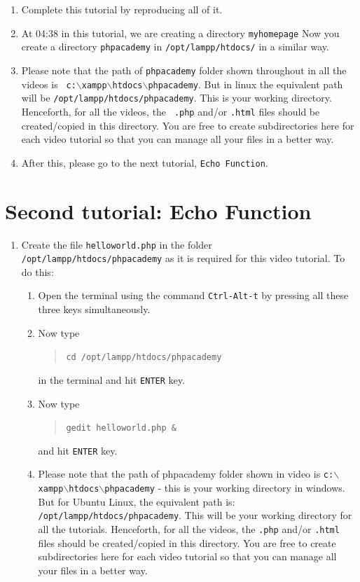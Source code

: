 \documentclass[11pt]{article}
\newenvironment{enumcpt}{\begin{enumerate} \topsep 0pt \partopsep 0pt 
    \parsep 0pt
    \itemsep 0pt \leftmargin -1in \rightmargin 0pt
}{\end{enumerate}}
\begin{document}
\begin{multicols}{2}
\begin{enumcpt}
\item Complete this tutorial by reproducing all of it.

\item At 04:38 in this tutorial, we are creating a directory {\tt myhomepage}  Now you create a directory {\tt phpacademy} in {\tt /opt/lampp/htdocs/} in a similar way.

\item Please note that the path of {\tt phpacademy} folder shown throughout in all the videos is {\tt
    c:$\backslash$xampp$\backslash$htdocs$\backslash$phpacademy}. But in linux the equivalent path will be {\tt /opt/lampp/htdocs/phpacademy}. This is your working directory. Henceforth, for all the videos, the {\tt
    .php} and/or {\tt .html} files should be created/copied in this
  directory. You are free to create subdirectories here for each video
  tutorial so that you can manage all your files in a better way.

\item   After this, please go to the next tutorial, {\tt Echo Function}.

  \end{enumcpt}


  \section{Second tutorial: Echo Function}
  \begin{enumcpt}
  \item Create the file {\tt helloworld.php} in the folder {\tt
    /opt/lampp/htdocs/phpacademy} as it is required for this video
    tutorial. To do this:
    \begin{enumcpt}
    \item Open the terminal using the command {\tt Ctrl-Alt-t} by
      pressing all these three keys simultaneously.
    \item Now type
      \begin{quote}
        {\tt cd /opt/lampp/htdocs/phpacademy}
      \end{quote}
      in the terminal and hit {\tt ENTER} key.
    \item  Now type 
      \begin{quote}
        {\tt gedit helloworld.php \&}
      \end{quote}
      and hit {\tt ENTER} key.
 \item Please note that the path of phpacademy folder shown in video is
    {\tt c:$\backslash$xampp$\backslash$htdocs$\backslash$phpacademy}
    - this is your working directory in windows. But for Ubuntu Linux, the
    equivalent path is: {\tt /opt/lampp/htdocs/phpacademy}. This will be your
    working directory for all the tutorials.  Henceforth, for all the videos, the {\tt .php} and/or
    {\tt .html} files should be created/copied in this directory. You are free
    to create subdirectories here for each video tutorial so that you
    can manage all your files in a better way.


\end{enumcpt}
\end{enumcpt}
\end{multicols}
\end{document}
